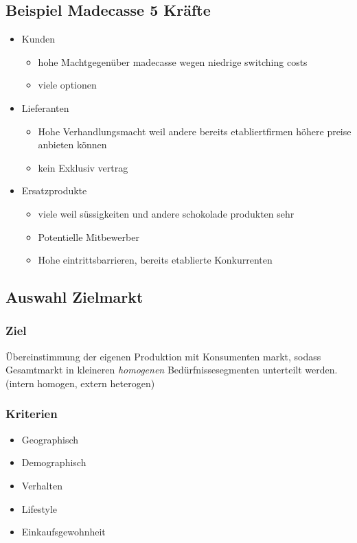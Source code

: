 \documentclass[a4paper]{article}
\begin{document}
    \subsection{Beispiel Madecasse 5 Kräfte}
    \begin{itemize}
        \item Kunden
        \begin{itemize}
            \item hohe Machtgegenüber madecasse wegen niedrige switching costs
            \item viele optionen
        \end{itemize}
        \item Lieferanten
        \begin{itemize}
            \item Hohe Verhandlungsmacht weil andere bereits etabliertfirmen höhere preise anbieten können
            \item kein Exklusiv vertrag
        \end{itemize}
        \item Ersatzprodukte
        \begin{itemize}
                
        \item viele weil süssigkeiten und andere schokolade produkten sehr
        \item Potentielle Mitbewerber
        \item Hohe eintrittsbarrieren, bereits etablierte Konkurrenten
    \end{itemize}
    \end{itemize}

    \subsection{Auswahl Zielmarkt}
    \subsubsection{Ziel}
    Übereinstimmung der eigenen Produktion mit Konsumenten markt, sodass Gesamtmarkt in kleineren \textit{homogenen} Bedürfnissesegmenten unterteilt werden. (intern homogen, extern heterogen)

    \subsubsection{Kriterien}
    \begin{itemize}
        \item Geographisch
        \item Demographisch
        \item Verhalten
        \item Lifestyle
        \item Einkaufsgewohnheit
    \end{itemize}
\end{document}
